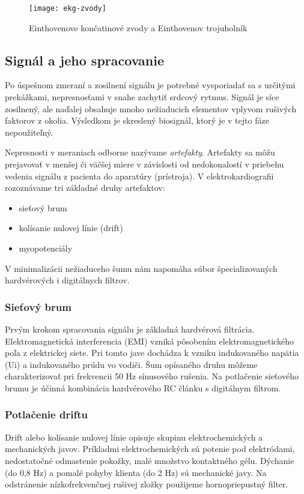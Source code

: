\documentclass[titlepage,12pt]{article}
\begin{document}
\begin{figure}[!ht]
\begin{center}
\texttt{[image: ekg-zvody]}
\caption{Einthovenove končatinové zvody a Einthovenov trojuholník}
\end{center}
\end{figure}


\subsection{Signál a jeho spracovanie}
Po úspešnom zmeraní a zosilnení signálu je potrebné vysporiadať sa s určitými prekážkami, nepresnosťami v snahe zachytiť srdcový rytmus. Signál je síce zosilnený, ale naďalej obsahuje mnoho nežiaducich elementov vplyvom rušivých faktorov z okolia. Výsledkom je skreslený biosignál, ktorý je v tejto fáze nepoužiteľný.

Nepresnosti v meraniach odborne nazývame \emph{artefakty}. Artefakty sa môžu prejavovať \linebreak v menšej či väčšej miere v závislosti od nedokonalostí v priebehu vedenia signálu z pacienta do aparatúry (prístroja). V elektrokardiografii rozoznávame tri základné druhy artefaktov:
\begin{itemize}
	\item sieťový brum
	\item kolísanie nulovej línie (drift)
	\item myopotenciály
\end{itemize}

V minimalizácii nežiaduceho šumu nám napomáha súbor špecializovaných hardvérových \linebreak i digitálnych filtrov.

\subsubsection{Sieťový brum}
Prvým krokom spracovania signálu je základná hardvérová filtrácia. Elektromagnetická interferencia (EMI) vzniká pôsobením  elektromagnetického poľa z elektrickej siete. Pri tomto jave dochádza k vzniku indukovaného napätia (Ui) a indukovaného prúdu vo vodiči. Šum opísaného druhu môžeme charakterizovať pri frekvencii 50 Hz sínusového rušenia. Na potlačenie sieťového brumu je účinná kombinácia hardvérového RC článku s digitálnym filtrom. 

\subsubsection{Potlačenie driftu}
Drift alebo kolísanie nulovej línie opisuje skupinu elektrochemických a mechanických javov. Príkladmi elektrochemických sú potenie pod elektródami, nedostatočné odmastenie pokožky, malé množstvo kontaktného gélu. Dýchanie (do 0,8 Hz) a pomalé pohyby klienta (do 2 Hz) sú mechanické javy. Na odstránenie nízkofrekvenčnej rušivej zložky použijeme hornopriepustný filter.
\end{document}
